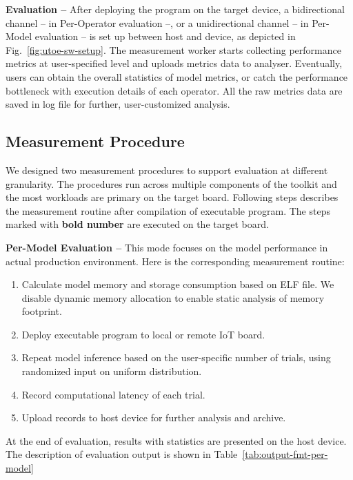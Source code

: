 {\bf Evaluation --} After deploying the program on the target device, a bidirectional channel -- in Per-Operator evaluation --, or a unidirectional channel -- in Per-Model evaluation -- is set up between host and device, as depicted in Fig.~\ref{fig:utoe-sw-setup}. The measurement worker starts collecting performance metrics at user-specified level and uploads metrics data to analyser. Eventually, users can obtain the overall statistics of model metrics, or catch the performance bottleneck with execution details of each operator. All the raw metrics data are saved in log file for further, user-customized analysis.

\subsection{Measurement Procedure}
We designed two measurement procedures to support evaluation at different granularity. The procedures run across multiple components of the toolkit and the most workloads are primary on the target board. Following steps describes the measurement routine after compilation of executable program. The steps marked with \textbf{bold number} are executed on the target board.

\newcommand{\itembf}{\item[\stepcounter{enumi}\textbf{\arabic{enumi})}]}
{\bf Per-Model Evaluation --}
This mode focuses on the model performance in actual production environment. Here is the corresponding measurement routine:
\begin{enumerate}[]
    \item Calculate model memory and storage consumption based on ELF file. We disable dynamic memory allocation to enable static analysis of memory footprint.
    \item Deploy executable program to local or remote IoT board.
    \itembf Repeat model inference based on the user-specific number of trials, using randomized input on uniform distribution.
    \itembf Record computational latency of each trial.
    \itembf Upload records to host device for further analysis and archive.
\end{enumerate}

At the end of evaluation, results with statistics are presented on the host device. The description of evaluation output is shown in Table~\ref{tab:output-fmt-per-model}

